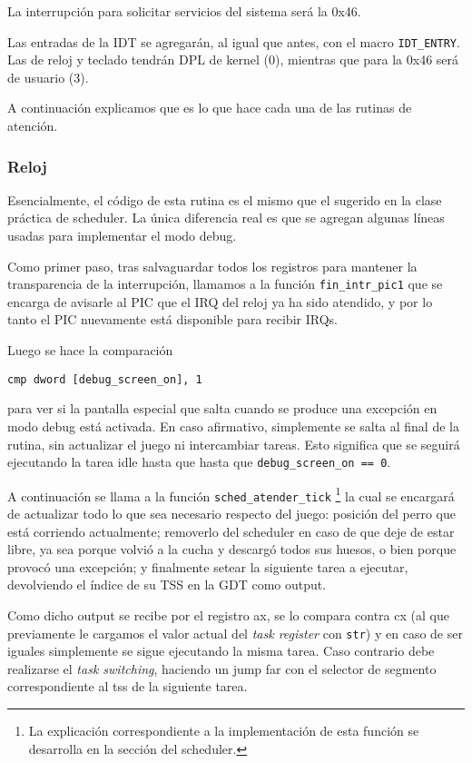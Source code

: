 La interrupción para solicitar servicios del sistema será la 0x46.

Las entradas de la IDT se agregarán, al igual que antes, con el macro \texttt{IDT\_ENTRY}. Las de reloj y teclado tendrán DPL de kernel (0), mientras que para la 0x46 será de usuario (3).

A continuación explicamos que es lo que hace cada una de las rutinas de atención.

	\subsubsection{Reloj}
	Esencialmente, el código de esta rutina es el mismo que el sugerido en la clase práctica de scheduler. La única diferencia real es que se agregan algunas líneas usadas para implementar el modo debug.

	Como primer paso, tras salvaguardar todos los registros para mantener la transparencia de la interrupción, llamamos a la función \texttt{fin\_intr\_pic1} que se encarga de avisarle al PIC que el IRQ del reloj ya ha sido atendido, y por lo tanto el PIC nuevamente está disponible para recibir IRQs. 

	Luego se hace la comparación 

	\texttt{cmp dword [debug\_screen\_on], 1}

	para ver si la pantalla especial que salta cuando se produce una excepción en modo debug está activada. En caso afirmativo, simplemente se salta al final de la rutina, sin actualizar el juego ni intercambiar tareas. Esto significa que se seguirá ejecutando la tarea idle hasta que hasta que \texttt{debug\_screen\_on == 0}.

	A continuación se llama a la función \texttt{sched\_atender\_tick} \footnote{La explicación correspondiente a la implementación de esta función se desarrolla en la sección del scheduler.} la cual se encargará de actualizar todo lo que sea necesario respecto del juego: posición del perro que está corriendo actualmente; removerlo del scheduler en caso de que deje de estar libre, ya sea porque volvió a la cucha y descargó todos sus huesos, o bien porque provocó una excepción; y finalmente setear la siguiente tarea a ejecutar, devolviendo el índice de su TSS en la GDT como output.

	Como dicho output se recibe por el registro ax, se lo compara contra cx (al que previamente le cargamos el valor actual del \textit{task register} con \texttt{str}) y en caso de ser iguales simplemente se sigue ejecutando la misma tarea. Caso contrario debe realizarse el \textit{task switching}, haciendo un jump far con el selector de segmento correspondiente al tss de la siguiente tarea.

